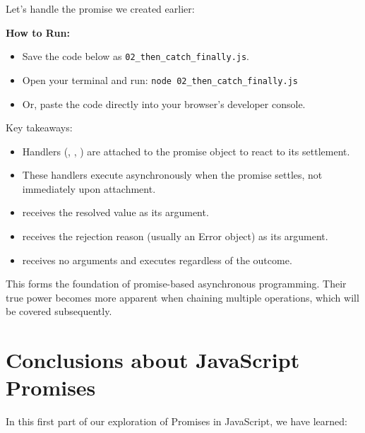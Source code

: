 Let's handle the promise we created earlier:

\textbf{How to Run:}
\begin{itemize}
    \item Save the code below as \verb|02_then_catch_finally.js|.
    \item Open your terminal and run: \verb|node 02_then_catch_finally.js|
    \item Or, paste the code directly into your browser's developer console.
\end{itemize}

\begin{macterminal}
  
\end{macterminal}

Key takeaways:
\begin{itemize}
    \item Handlers (, , ) are attached to the promise object to react to its settlement.
    \item These handlers execute asynchronously when the promise settles, not immediately upon attachment.
    \item {} receives the resolved value as its argument.
    \item {} receives the rejection reason (usually an Error object) as its argument.
    \item {} receives no arguments and executes regardless of the outcome.
\end{itemize}

This forms the foundation of promise-based asynchronous programming. Their true power becomes more apparent when chaining multiple operations, which will be covered subsequently.

\section{Conclusions about JavaScript Promises}

In this first part of our exploration of Promises in JavaScript, we have learned:

